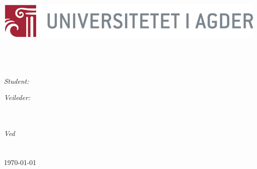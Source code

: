\documentclass[11pt, oneside]{Thesis} %
\begin{document}
\begin{titlepage}
\begin{center}

\includegraphics[scale=1.5]{logo} \\[1.5cm]
\HRule \\[0.4cm] %
{\huge \bfseries \ttitle}\\[0.4cm] %
\HRule \\[1.5cm] %
 
\begin{minipage}{0.4\textwidth}
\begin{flushleft} \large
\emph{Student:}\\
{\authornames} %
\end{flushleft}
\end{minipage}
\begin{minipage}{0.4\textwidth}
\begin{flushright} \large
\emph{Veileder:} \\
{\supname}\\ %

\end{flushright}
\end{minipage}\\[3cm]
 

\textit{Ved}\\[0.4cm]
\groupname\\\univname\\[4cm] %
 
{\large \today}\\[4cm] %
 
\vfill
\end{center}

\end{titlepage}

%
\end{document}
